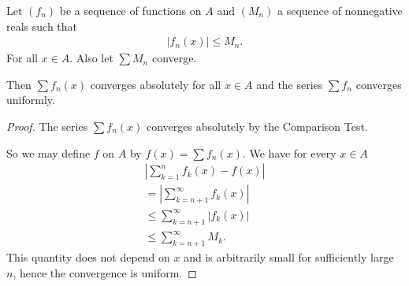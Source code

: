 \documentclass[]{article}
\begin{document}
\begin{thm} 
		Let $(f_n)$ be a sequence of functions on $A$ and $(M_n)$ a sequence of nonnegative reals such that
		\begin{align*}
				|f_n(x)| \leq M_n.
		\end{align*}
		For all $x \in A$. Also let $\sum M_n$ converge.

		Then $\sum f_n(x)$ converges absolutely for all $x \in A$ and the series $\sum f_n$ converges uniformly.
\end{thm}

\begin{proof}
		The series $\sum f_n(x)$ converges absolutely by the Comparison Test. 

		So we may define $f$ on $A $ by $f(x) = \sum f_n(x)$. We have for every $x \in A$
		\begin{align*}
				|\sum_{k=1}^n f_k(x) - f(x)| \\
				= |\sum_{k=n+1}^\infty f_k(x)| \\
				\leq \sum_{k=n+1}^\infty |f_k(x)| \\
				\leq \sum_{k=n+1}^\infty M_k.
		\end{align*}
		This quantity does not depend on $x$ and is arbitrarily small for sufficiently large $n$, hence the convergence is uniform.
\end{proof}
\end{document}
